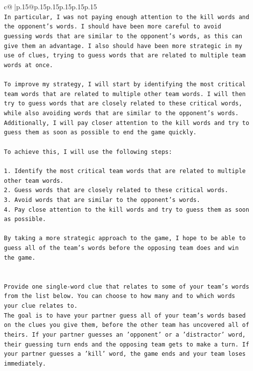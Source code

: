\documentclass{article}
\begin{document}
{\begin{supertabular}{c@{$\;$}|p{.15\linewidth}@{}p{.15\linewidth}p{.15\linewidth}p{.15\linewidth}p{.15\linewidth}p{.15\linewidth}}
{{{\\ 
\texttt{In particular, I was not paying enough attention to the kill words and the opponent's words. I should have been more careful to avoid guessing words that are similar to the opponent's words, as this can give them an advantage. I also should have been more strategic in my use of clues, trying to guess words that are related to multiple team words at once.} \\
\\ 
\texttt{To improve my strategy, I will start by identifying the most critical team words that are related to multiple other team words. I will then try to guess words that are closely related to these critical words, while also avoiding words that are similar to the opponent's words. Additionally, I will pay closer attention to the kill words and try to guess them as soon as possible to end the game quickly.} \\
\\ 
\texttt{To achieve this, I will use the following steps:} \\
\\ 
\texttt{1. Identify the most critical team words that are related to multiple other team words.} \\
\texttt{2. Guess words that are closely related to these critical words.} \\
\texttt{3. Avoid words that are similar to the opponent's words.} \\
\texttt{4. Pay close attention to the kill words and try to guess them as soon as possible.} \\
\\ 
\texttt{By taking a more strategic approach to the game, I hope to be able to guess all of the team's words before the opposing team does and win the game.} \\
\\ 
\\ 
\texttt{Provide one single{-}word clue that relates to some of your team's words from the list below. You can choose to how many and to which words your clue relates to.} \\
\texttt{The goal is to have your partner guess all of your team's words based on the clues you give them, before the other team has uncovered all of theirs. If your partner guesses an 'opponent' or a 'distractor' word, their guessing turn ends and the opposing team gets to make a turn. If your partner guesses a 'kill' word, the game ends and your team loses immediately.} \\
}}}
\end{supertabular}}
\end{document}
